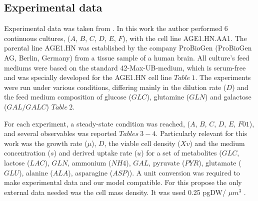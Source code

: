 \subsection{Experimental data} 
	Experimental data was taken from \cite{Rath2017a}. In this work the author performed 6 continuous cultures, ($A$, $B$, $C$, $D$, $E$, $F$), with the cell line AGE1.HN.AA1. The parental line AGE1.HN was established by the company ProBioGen (ProBioGen AG, Berlin, Germany) from a tissue sample of a human brain. All culture's feed mediums were based on the standard 42-Max-UB-medium, which is serum-free and was specially developed for the AGE1.HN cell line $Table\ 1$. The experiments were run under various conditions, differing mainly in the dilution rate ($D$) and the feed medium composition of glucose ($GLC$), glutamine ($GLN$) and galactose ($GAL/GALC$) $Table\ 2$.
	
	For each experiment, a steady-state condition was reached, ($A$, $B$, $C$, $D$, $E$, $F01$), and several observables  was reported $Tables\ 3-4$. Particularly relevant for this work was the growth rate ($\mu$), $D$, the viable cell density ($Xv$) and the medium concentration ($s$) and derived uptake rate ($u$) for a set of metabolites ($GLC$, lactose ($LAC$), $GLN$, ammonium ($NH4$), $GAL$, pyruvate ($PYR$), glutamate ($GLU$), alanine ($ALA$), asparagine ($ASP$)). A unit conversion was required to make experimental data and our model compatible. For this propose the only external data needed was the cell mass density. It was used  0.25 pgDW/ $\mu$$m^3$ \cite{Niklas2011}.